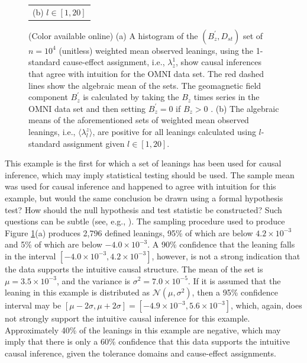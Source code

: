 \documentclass[twocolumn,aps,pre,groupedaddress]{revtex4-1}
\begin{document}
\begin{figure}[ht]
\begin{tabular}{c}
(b) $l\in[1,20]$
\end{tabular}
\caption{(Color available online) (a) A histogram of the $(B_z^\prime,D_{st})$ set of $n=10^4$ (unitless) weighted mean observed leanings, using the 1-standard cause-effect assignment, i.e., $\lambda^1_{z}$, show causal inferences that agree with intuition for the OMNI data set.  The red dashed lines show the algebraic mean of the sets.  The geomagnetic field component $B_z^\prime$ is calculated by taking the $B_z$ times series in the OMNI data set and then setting $B_z^\prime = 0$ if $B_z>0$ \cite{Burton1975,Dungey1961}. (b) The algebraic means of the aforementioned sets of weighted mean observed leanings, i.e., $\langle\lambda^z_l\rangle$, are positive for all leanings calculated using $l$-standard assignment given $l\in[1,20]$.}
\label{fig:dsthist}
\end{figure}

This example is the first for which a set of leanings has been used for causal inference, which may imply statistical testing should be used.  The sample mean was used for causal inference and happened to agree with intuition for this example, but would the same conclusion be drawn using a formal hypothesis test?  How should the null hypothesis and test statistic be constructed?  Such questions can be subtle (see, e.g., \cite{Rubin2015}).  The sampling procedure used to produce Figure \ref{fig:dsthist}(a) produces 2,796 defined leanings, 95\% of which are below $4.2\times 10^{-3}$ and 5\% of which are below $-4.0\times 10^{-3}$.  A 90\% confidence that the leaning falls in the interval $[-4.0\times 10^{-3},4.2\times10^{-3}]$, however, is not a strong indication that the data supports the intuitive causal structure.  The mean of the set is $\mu = 3.5\times 10^{-3}$, and the variance is $\sigma^2 = 7.0\times 10^{-5}$.  If it is assumed that the leaning in this example is distributed as $\mathcal{N}(\mu,\sigma^2)$, then a 95\% confidence interval may be $[\mu-2\sigma,\mu+2\sigma]=[-4.9\times 10^{-3},5.6\times 10^{-3}]$, which, again, does not strongly support the intuitive causal inference for this example.  Approximately 40\% of the leanings in this example are negative, which may imply that there is only a 60\% confidence that this data supports the intuitive causal inference, given the tolerance domains and cause-effect assignments.  
\end{document}
